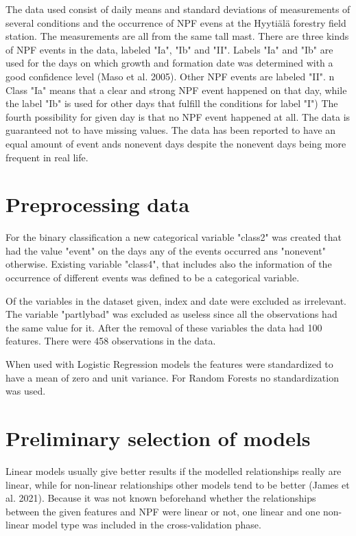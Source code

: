 \documentclass[a4size, 12pt]{report}
\begin{document}
	The data used consist of daily means and standard deviations of measurements of several conditions and the occurrence of NPF evens at the Hyytiälä forestry field station. The measurements are all from the same tall mast. There are three kinds of NPF events in the data, labeled "Ia", "Ib" and "II". Labels "Ia" and "Ib" are used for the days on which growth and formation date was determined with a good confidence level (Maso et al. 2005). Other NPF events are labeled "II".
	n  Class "Ia" means that a clear and strong NPF event happened on that day, while the label "Ib" is used for other days that fulfill the conditions for label "I")  The fourth possibility for given day is that no NPF event happened at all. The data is guaranteed not to have missing values. The data has been reported to have an equal amount of event ands nonevent days despite the nonevent days being more frequent in real life.
	
 
	
	\section*{Preprocessing data}
	
		For the binary classification a new categorical variable "class2" was created that had the value "event" on the days any of the events occurred ans "nonevent" otherwise. Existing variable "class4", that includes also the information of the occurrence of different events was defined to be a categorical variable. 
		
		Of the variables in the dataset given, index and date were excluded as irrelevant. The variable "partlybad" was excluded as useless since all the observations had the same value for it. After the removal of these variables the data had 100 features. There were 458 observations in the data. 
		 
		When used with Logistic Regression models the features were standardized to have a mean of zero and unit variance. For Random Forests no standardization was used.  

	
	\section*{Preliminary selection of models}
	
	Linear models usually give better results if the modelled relationships really are linear, while for non-linear relationships other models tend to be better (James et al. 2021). Because it was not known beforehand whether the relationships between the given features and NPF were linear or not, one linear and one non-linear model type was included in the cross-validation phase.  
	
\end{document}
